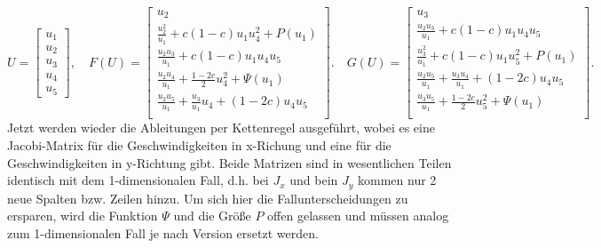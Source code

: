 \[
U = \left[\begin{array}{c} u_1 \\ u_2 \\ u_3 \\ u_{4}
      \\ u_{5} \end{array}\right],
\quad 
%
F(U) = \left[\begin{array}{c}
    u_2 \\[2mm]
    \frac{u_2^2}{u_1} + c (1-c) u_1 u_{4}^2 + P(u_1)  \\[2mm]
    \frac{u_2u_3}{u_1} + c(1-c) u_1 u_{4} u_{5}\\[2mm]
    \frac{u_2 u_{4}}{u_1}  + \frac{1-2c}{2} u_{4}^2 + \Psi(u_1)\\[2mm]
    \frac{u_2 u_{5}}{u_1}  + \frac{u_3}{u_1} u_{4} + (1-2c)u_{4} u_{5}\\[2mm]
  \end{array}\right]. 
\quad
G(U) = \left[\begin{array}{c}
    u_3 \\[2mm]
    \frac{u_2u_3}{u_1} + c(1-c) u_1 u_{4} u_{5}\\[2mm]
    \frac{u_3^2}{u_1} + c (1-c) u_1 u_{5}^2 + P(u_1) \\[2mm]
    \frac{u_2 u_{5}}{u_1}  + \frac{u_3 u_{4}}{u_1}  + (1-2c)u_{4} u_{5}\\[2mm]
    \frac{u_3 u_{5}}{u_1} + \frac{1-2c}{2} u_{5}^2 + \Psi(u_1)\\[2mm]
  \end{array}\right]. 
\]
Jetzt werden wieder die Ableitungen per Kettenregel ausgeführt, wobei
es eine Jacobi-Matrix für die Geschwindigkeiten in x-Richung und eine
für die Geschwindigkeiten in y-Richtung gibt.  Beide Matrizen sind in
wesentlichen Teilen identisch mit dem 1-dimensionalen Fall, d.h. bei
$J_x$ und bein $J_y$ kommen nur 2 neue Spalten bzw. Zeilen hinzu. Um
sich hier die Fallunterscheidungen zu ersparen, wird die Funktion
$\Psi$ und die Größe $P$ offen gelassen und müssen analog zum
1-dimensionalen Fall je nach Version ersetzt werden.

